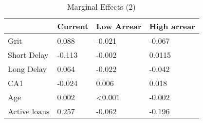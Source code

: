 \begin{table}[ht]
\centering
\caption{Marginal Effects (2)}
\label{tab:me2}
\begin{tabular}{@{}llll@{}}
\toprule
             & Current & Low Arrear       & High arrear \\ \midrule
Grit         & 0.088   & -0.021           & -0.067      \\
Short Delay  & -0.113  & -0.002           & 0.0115      \\
Long Delay   & 0.064   & -0.022           & -0.042      \\
CA1          & -0.024  & 0.006            & 0.018       \\
Age          & 0.002   & \textless{}0.001 & -0.002      \\
Active loans & 0.257   & -0.062           & -0.196      \\ \bottomrule
\end{tabular}
\end{table}